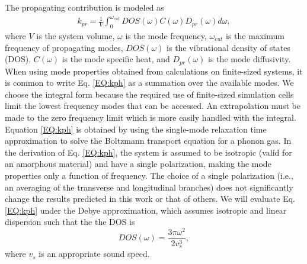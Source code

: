 \documentclass[aps,prb,onecolumn,preprint,superscriptaddress,footinbib,amsmath,amssymb,floatfix]{revtex4}
\begin{document}
The propagating contribution is modeled as
\cite{feldman_thermal_1993,feldman_numerical_1999} 
\begin{equation}\label{EQ:kph}
\begin{split}
k_{pr} = \frac{1}{V}\int_{0}^{\omega_{cut}} 
DOS(\omega) C(\omega) D_{pr}(\omega)d\omega,
\end{split}
\end{equation}
where $V$ is the system volume, $\omega$ is the mode 
frequency, $\omega_{cut}$ is the maximum frequency of propagating 
modes,  
$DOS(\omega)$ is the vibrational 
density of states (DOS), $C(\omega)$ is the mode specific heat, 
and $D_{pr}(\omega)$ is the mode diffusivity. When using mode 
properties obtained from calculations on finite-sized systems, 
it is common 
to write Eq. \eqref{EQ:kph} as a summation over the available modes.
\cite{feldman_thermal_1993,feldman_numerical_1999}
We choose the integral form because the required use of finite-sized 
simulation cells limit the lowest frequency 
modes that can be accessed. An extrapolation 
must be made to the zero frequency limit which is more easily 
handled with the integral.
\cite{love_estimate_1990,feldman_thermal_1993,cahill_thermal_1994,
feldman_numerical_1999,baldi_thermal_2008,
liu_high_2009,yang_anomalously_2010}    
Equation \eqref{EQ:kph} is obtained by using the single-mode relaxation
time approximation to solve 
the Boltzmann transport equation for a phonon gas.
\cite{ziman_electrons_2001} In the derivation of Eq. 
\eqref{EQ:kph}, the system is assumed to be isotropic 
(valid for an amorphous material) 
and have a single polarization, 
making the mode properties only a function of frequency. The 
choice of a single polarization (i.e., an averaging 
of the transverse and longitudinal branches) 
does not significantly change the results predicted in this work  
or that of others.
\cite{feldman_thermal_1993,cahill_thermal_1994,
feldman_numerical_1999,baldi_thermal_2008,liu_high_2009,
yang_anomalously_2010} 
We will evaluate Eq. \eqref{EQ:kph} under the Debye approximation, 
which assumes isotropic and linear dispersion such that the 
the DOS is
\begin{equation}\label{EQ:DOS_debye}
DOS(\omega) = \frac{3\pi\omega^2}{2v_{s}^3},
\end{equation}
where $v_s$ is an appropriate sound speed.\cite{ashcroft_solid_1976} 
\end{document}
